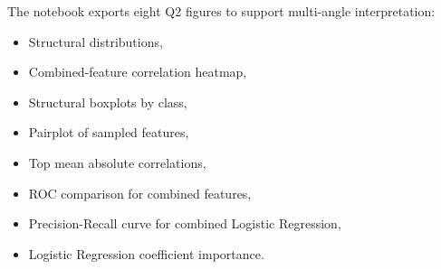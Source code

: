 The notebook exports eight Q2 figures to support multi-angle interpretation:
\begin{itemize}
    \item Structural distributions,
    \item Combined-feature correlation heatmap,
    \item Structural boxplots by class,
    \item Pairplot of sampled features,
    \item Top mean absolute correlations,
    \item ROC comparison for combined features,
    \item Precision-Recall curve for combined Logistic Regression,
    \item Logistic Regression coefficient importance.
\end{itemize}
